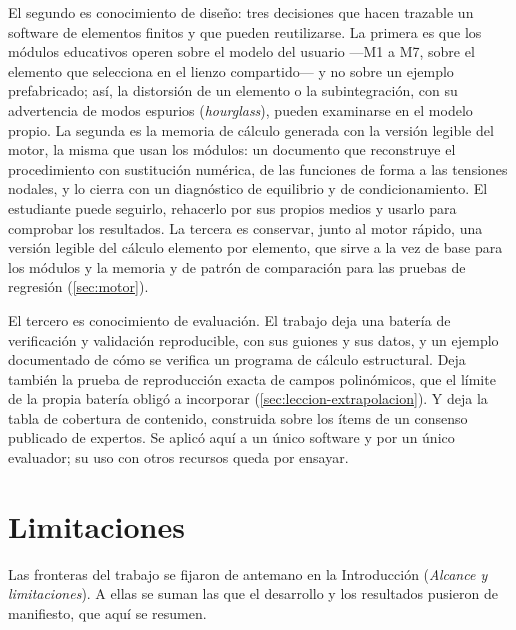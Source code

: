 El segundo es conocimiento de diseño: tres decisiones que hacen trazable un software de elementos finitos y que pueden reutilizarse. La primera es que los módulos educativos operen sobre el modelo del usuario ---M1 a M7, sobre el elemento que selecciona en el lienzo compartido--- y no sobre un ejemplo prefabricado; así, la distorsión de un elemento o la subintegración, con su advertencia de modos espurios (\emph{hourglass}), pueden examinarse en el modelo propio. La segunda es la memoria de cálculo generada con la versión legible del motor, la misma que usan los módulos: un documento que reconstruye el procedimiento con sustitución numérica, de las funciones de forma a las tensiones nodales, y lo cierra con un diagnóstico de equilibrio y de condicionamiento. El estudiante puede seguirlo, rehacerlo por sus propios medios y usarlo para comprobar los resultados. La tercera es conservar, junto al motor rápido, una versión legible del cálculo elemento por elemento, que sirve a la vez de base para los módulos y la memoria y de patrón de comparación para las pruebas de regresión (\autoref{sec:motor}).

El tercero es conocimiento de evaluación. El trabajo deja una batería de verificación y validación reproducible, con sus guiones y sus datos, y un ejemplo documentado de cómo se verifica un programa de cálculo estructural. Deja también la prueba de reproducción exacta de campos polinómicos, que el límite de la propia batería obligó a incorporar (\autoref{sec:leccion-extrapolacion}). Y deja la tabla de cobertura de contenido, construida sobre los ítems de un consenso publicado de expertos. Se aplicó aquí a un único software y por un único evaluador; su uso con otros recursos queda por ensayar.

\section*{Limitaciones}

Las fronteras del trabajo se fijaron de antemano en la Introducción (\emph{Alcance y limitaciones}). A ellas se suman las que el desarrollo y los resultados pusieron de manifiesto, que aquí se resumen.

